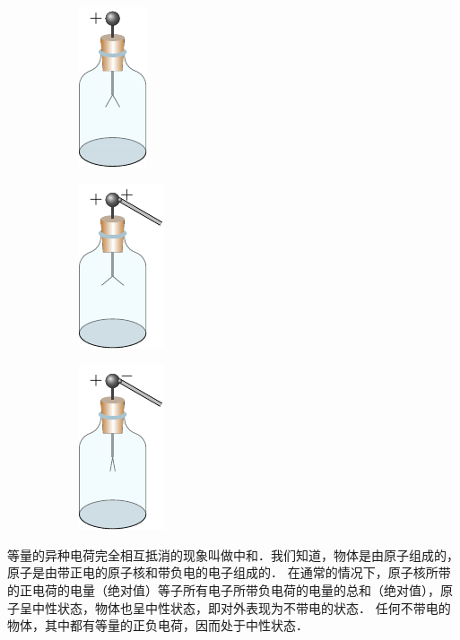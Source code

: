 \begin{figure}[htbp]
	\centering
	\begin{subfigure}{0.3\linewidth}
		\centering
		\includegraphics{fig/B/6-1a.pdf}
		\caption{}\label{fig_B_6-1a}
	\end{subfigure}
	\hfil
	\begin{subfigure}{0.3\linewidth}
		\centering
		\includegraphics{fig/B/6-1b.pdf}
		\caption{}\label{fig_B_6-1b}
	\end{subfigure}
	\hfil
	\begin{subfigure}{0.3\linewidth}
		\centering
		\includegraphics{fig/B/6-1c.pdf}
		\caption{}\label{fig_B_6-1c}
	\end{subfigure}
	\caption{}\label{fig_B_6-1}
\end{figure}



等量的异种电荷完全相互抵消的现象叫做中和．我们知道，物体是由原子组成的，原子是由带正电的原子核和带负电的电子组成的．
在通常的情况下，原子核所带的正电荷的电量（绝对值）等子所有电子所带负电荷的电量的总和（绝对值），原子呈中性状态，物体也呈中性状态，即对外表现为不带电的状态．
任何不带电的物体，其中都有等量的正负电荷，因而处于中性状态．

